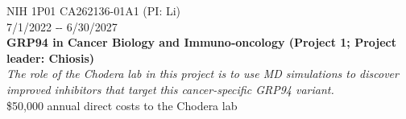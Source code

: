 \documentclass[10pt]{article}
\begin{document}
\vspace{1.5ex}

NIH 1P01 CA262136-01A1 (PI: Li) \\
7/1/2022 ‑- 6/30/2027\\
{\bf GRP94 in Cancer Biology and Immuno‑oncology (Project 1; Project leader: Chiosis)}\\
\emph{The role of the Chodera lab in this project is to use MD simulations to discover improved inhibitors that target this cancer-specific GRP94 variant.}\\
\$50,000 annual direct costs to the Chodera lab

%





%
\end{document}
